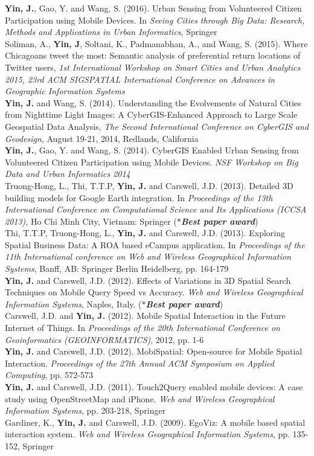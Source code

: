 \documentclass[11pt, a4paper]{article}
\newcommand{\years}[1]{\marginnote{\scriptsize #1}}
\begin{document}
\years{2016}\textbf{Yin, J.}, Gao, Y. and Wang, S. (2016). Urban Sensing from Volunteered Citizen Participation using Mobile Devices. In \emph{Seeing Cities through Big Data: Research, Methods and Applications in Urban Informatics}, Springer\\
\years{2015}Soliman, A., \textbf{Yin, J}, Soltani, K., Padmanabhan, A., and Wang, S. (2015). Where Chicagoans tweet the most: Semantic analysis of preferential return locations of Twitter users, \textit{1st International Workshop on Smart Cities and Urban Analytics 2015, 23rd ACM SIGSPATIAL International Conference on Advances in Geographic Information Systems}\\ 
\years{2014}\textbf{Yin, J.} and Wang, S. (2014). Understanding the Evolvements of Natural Cities from Nighttime Light Images: A CyberGIS-Enhanced Approach to Large Scale Geospatial Data Analysis, \textit{The Second International Conference on CyberGIS and Geodesign}, August 19-21, 2014, Redlands, California\\
\years{2014}\textbf{Yin, J.}, Gao, Y. and Wang, S. (2014). CyberGIS Enabled Urban Sensing from Volunteered Citizen Participation using Mobile Devices. \textit{NSF Workshop on Big Data and Urban Informatics 2014}\\
\years{2013}Truong-Hong, L., Thi, T.T.P, \textbf{Yin, J.} and Carswell, J.D. (2013). Detailed 3D building models for Google Earth integration. In \textit{Proceedings of the 13th International Conference on Computational Science and Its Applications (ICCSA 2013)}, Ho Chi Minh City, Vietnam: Springer (\textbf{\emph{$*$Best paper award}})\\
\years{2013}Thi, T.T.P, Truong-Hong, L., \textbf{Yin, J.} and Carswell, J.D. (2013). Exploring Spatial Business Data: A ROA based eCampus application. In \textit{Proceedings of the 11th International conference on Web and Wireless Geographical Information Systems}, Banff, AB: Springer Berlin Heidelberg, pp. 164-179\\
\years{2012}\textbf{Yin, J.} and Carswell, J.D. (2012). Effects of Variations in 3D Spatial Search Techniques on Mobile Query Speed vs Accuracy. \textit{Web and Wireless Geographical Information Systems}, Naples, Italy. (\textbf{\emph{$*$Best paper award}})\\
\years{2012}Carswell, J.D. and \textbf{Yin, J.} (2012). Mobile Spatial Interaction in the Future Internet of Things. In \textit{Proceedings of the 20th International Conference on Geoinformatics (GEOINFORMATICS)}, 2012, pp. 1-6\\
\years{2012}\textbf{Yin, J.} and Carswell, J.D. (2012). MobiSpatial: Open-source for Mobile Spatial Interaction. \textit{Proceedings of the 27th Annual ACM Symposium on Applied Computing}, pp. 572-573\\
\years{2012}\textbf{Yin, J.} and Carswell, J.D. (2011). Touch2Query enabled mobile devices: A case study using OpenStreetMap and iPhone. \textit{Web and Wireless Geographical Information Systems}, pp. 203-218, Springer\\
\years{2009} Gardiner, K., \textbf{Yin, J.} and Carswell, J.D. (2009). EgoViz: A mobile based spatial interaction system. \textit{Web and Wireless Geographical Information Systems}, pp. 135-152, Springer
\end{document}
